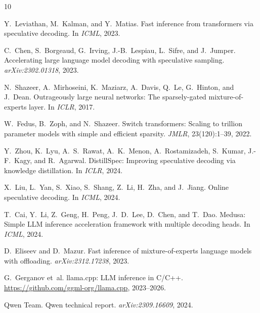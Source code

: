 \documentclass[11pt,a4paper]{article}
\begin{document}
\begin{thebibliography}{10}

Y.~Leviathan, M.~Kalman, and Y.~Matias.
\newblock Fast inference from transformers via speculative decoding.
\newblock In \emph{ICML}, 2023.

C.~Chen, S.~Borgeaud, G.~Irving, J.-B.~Lespiau, L.~Sifre, and J.~Jumper.
\newblock Accelerating large language model decoding with speculative sampling.
\newblock \emph{arXiv:2302.01318}, 2023.

N.~Shazeer, A.~Mirhoseini, K.~Maziarz, A.~Davis, Q.~Le, G.~Hinton, and J.~Dean.
\newblock Outrageously large neural networks: The sparsely-gated mixture-of-experts layer.
\newblock In \emph{ICLR}, 2017.

W.~Fedus, B.~Zoph, and N.~Shazeer.
\newblock Switch transformers: Scaling to trillion parameter models with simple and efficient sparsity.
\newblock \emph{JMLR}, 23(120):1--39, 2022.

Y.~Zhou, K.~Lyu, A.~S.~Rawat, A.~K.~Menon, A.~Rostamizadeh, S.~Kumar, J.-F.~Kagy, and R.~Agarwal.
\newblock DistillSpec: Improving speculative decoding via knowledge distillation.
\newblock In \emph{ICLR}, 2024.

X.~Liu, L.~Yan, S.~Xiao, S.~Shang, Z.~Li, H.~Zha, and J.~Jiang.
\newblock Online speculative decoding.
\newblock In \emph{ICML}, 2024.

T.~Cai, Y.~Li, Z.~Geng, H.~Peng, J.~D.~Lee, D.~Chen, and T.~Dao.
\newblock Medusa: Simple LLM inference acceleration framework with multiple decoding heads.
\newblock In \emph{ICML}, 2024.

D.~Eliseev and D.~Mazur.
\newblock Fast inference of mixture-of-experts language models with offloading.
\newblock \emph{arXiv:2312.17238}, 2023.

G.~Gerganov et~al.
\newblock llama.cpp: LLM inference in C/C++.
\newblock \url{https://github.com/ggml-org/llama.cpp}, 2023--2026.

Qwen Team.
\newblock Qwen technical report.
\newblock \emph{arXiv:2309.16609}, 2024.

\end{thebibliography}
\end{document}
